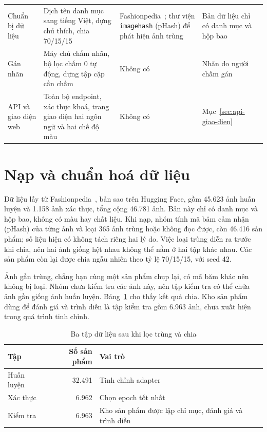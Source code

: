 \begin{table}[H]
\begin{tabularx}{\textwidth}{@{}>{\raggedright\arraybackslash}p{2.6cm} Y Y Y@{}}
Chuẩn bị dữ liệu & Dịch tên danh mục sang tiếng Việt, dựng chú thích, chia 70/15/15 & Fashionpedia~\cite{jia2020fashionpedia}; thư viện \texttt{imagehash} (pHash) để phát hiện ảnh trùng & Bản dữ liệu chỉ có danh mục và hộp bao \\
Gán nhãn & Máy chủ chấm nhãn, bộ lọc chấm 0 tự động, dựng tập cặp cần chấm & Không có & Nhãn do người chấm gán \\
API và giao diện web & Toàn bộ endpoint, xác thực khoá, trang giao diện hai ngôn ngữ và hai chế độ màu & Không có & Mục~\ref{sec:api-giao-dien} \\
\bottomrule
\end{tabularx}
\end{table}

\section{Nạp và chuẩn hoá dữ liệu}
\label{sec:nap-du-lieu}

Dữ liệu lấy từ Fashionpedia~\cite{jia2020fashionpedia}, bản sao trên Hugging Face, gồm 45.623 ảnh huấn luyện và 1.158 ảnh xác thực, tổng cộng 46.781 ảnh. Bản này chỉ có danh mục và hộp bao, không có màu hay chất liệu. Khi nạp, nhóm tính mã băm cảm nhận (pHash) của từng ảnh và loại 365 ảnh trùng hoặc không đọc được, còn 46.416 sản phẩm; số liệu hiện có không tách riêng hai lý do. Việc loại trùng diễn ra trước khi chia, nên hai ảnh giống hệt nhau không thể nằm ở hai tập khác nhau. Các sản phẩm còn lại được chia ngẫu nhiên theo tỷ lệ 70/15/15, với seed 42.

Ảnh gần trùng, chẳng hạn cùng một sản phẩm chụp lại, có mã băm khác nên không bị loại. Nhóm chưa kiểm tra các ảnh này, nên tập kiểm tra có thể chứa ảnh gần giống ảnh huấn luyện. Bảng~\ref{tab:c4_chia} cho thấy kết quả chia. Kho sản phẩm dùng để đánh giá và trình diễn là tập kiểm tra gồm 6.963 ảnh, chưa xuất hiện trong quá trình tinh chỉnh.

\begin{table}[H]
\centering
\caption{Ba tập dữ liệu sau khi lọc trùng và chia}
\label{tab:c4_chia}
\small
\renewcommand{\arraystretch}{1.1}
\begin{tabularx}{\textwidth}{@{}p{3.0cm} r@{\hspace{1.5em}}X@{}}
\toprule
\textbf{Tập} & \textbf{Số sản phẩm} & \textbf{Vai trò} \\
\midrule
Huấn luyện & 32.491 & Tinh chỉnh adapter \\
Xác thực & 6.962 & Chọn epoch tốt nhất \\
Kiểm tra & 6.963 & Kho sản phẩm được lập chỉ mục, đánh giá và trình diễn \\
\bottomrule
\end{tabularx}
\end{table}

